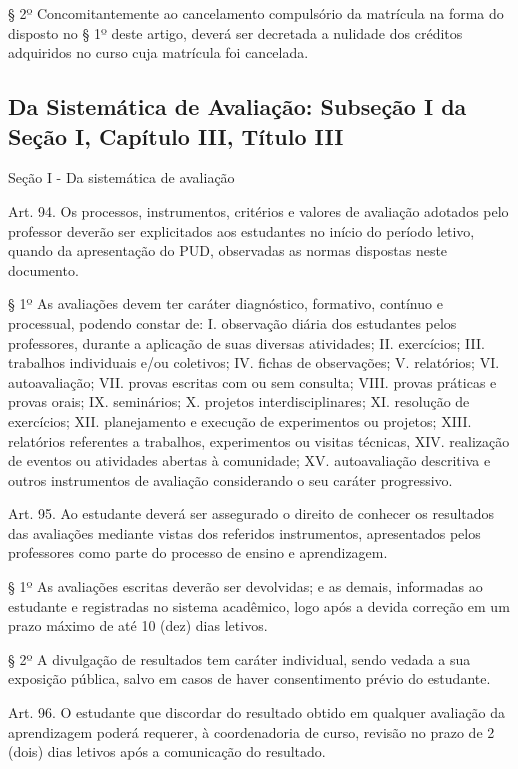 {§ 2º Concomitantemente ao cancelamento compulsório da matrícula na forma do disposto no § 1º deste artigo, deverá ser decretada a nulidade dos créditos adquiridos no curso cuja matrícula foi cancelada.

\subsection*{\footnotesize  Da Sistemática de Avaliação: Subseção I da Seção I, Capítulo III, Título III}
\label{anexoRODavaliacao}

\begin{center}
	Seção I - Da sistemática de avaliação
\end{center}

Art. 94. Os processos, instrumentos, critérios e valores de avaliação adotados pelo professor deverão ser explicitados aos estudantes no início do período letivo, quando da apresentação do PUD, observadas as normas dispostas neste documento.

§ 1º As avaliações devem ter caráter diagnóstico, formativo, contínuo e processual, podendo constar de:
I. observação diária dos estudantes pelos professores, durante a aplicação de suas diversas atividades;
II. exercícios;
III. trabalhos individuais e/ou coletivos;
IV. fichas de observações;
V. relatórios;
VI. autoavaliação;
VII. provas escritas com ou sem consulta;
VIII. provas práticas e provas orais;
IX. seminários;
X. projetos interdisciplinares;
XI. resolução de exercícios;
XII. planejamento e execução de experimentos ou projetos;
XIII. relatórios referentes a trabalhos, experimentos ou visitas técnicas,
XIV. realização de eventos ou atividades abertas à comunidade;
XV. autoavaliação descritiva e outros instrumentos de avaliação considerando o seu caráter progressivo.

Art. 95. Ao estudante deverá ser assegurado o direito de conhecer os resultados das avaliações mediante vistas dos referidos instrumentos, apresentados pelos professores como parte do processo de ensino e aprendizagem.

§ 1º As avaliações escritas deverão ser devolvidas; e as demais, informadas ao estudante e registradas no sistema acadêmico, logo após a devida correção em um prazo máximo de até 10 (dez) dias letivos.

§ 2º A divulgação de resultados tem caráter individual, sendo vedada a sua exposição pública, salvo em casos de haver consentimento prévio do estudante.

Art. 96. O estudante que discordar do resultado obtido em qualquer avaliação da aprendizagem poderá requerer, à coordenadoria de curso, revisão no prazo de 2 (dois) dias letivos após a comunicação do resultado.

}
